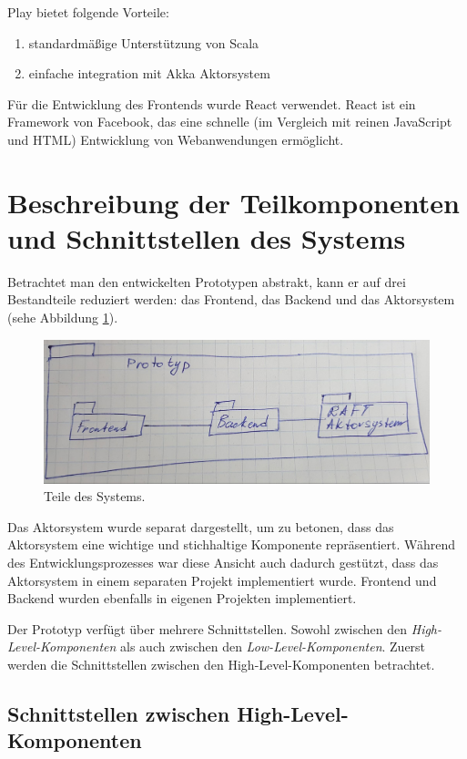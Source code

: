 Play bietet folgende Vorteile:

\begin{enumerate}
	\item standardmäßige Unterstützung von Scala
	
	\item einfache integration mit Akka Aktorsystem
\end{enumerate}

Für die Entwicklung des Frontends wurde React verwendet. React ist ein Framework von Facebook, das eine schnelle (im Vergleich mit reinen JavaScript und HTML) Entwicklung von Webanwendungen ermöglicht.

\section{Beschreibung der Teilkomponenten und Schnittstellen des Systems}

Betrachtet man den entwickelten Prototypen abstrakt, kann er auf drei Bestandteile reduziert werden: das Frontend, das Backend und das Aktorsystem (sehe Abbildung \ref{fig:system}).

\begin{figure}
	\centering
	\includegraphics[width=0.7\linewidth]{images/7_system}
	\caption{Teile des Systems.}
	\label{fig:system}
\end{figure}

Das Aktorsystem wurde separat dargestellt, um zu betonen, dass das Aktorsystem eine wichtige und stichhaltige Komponente repräsentiert. Während des Entwicklungsprozesses war diese Ansicht auch dadurch gestützt, dass das Aktorsystem in einem separaten Projekt implementiert wurde. Frontend und Backend wurden ebenfalls in eigenen Projekten implementiert.

Der Prototyp verfügt über mehrere Schnittstellen. Sowohl zwischen den \textit{High-Level-Komponenten} als auch zwischen den \textit{Low-Level-Komponenten}. Zuerst werden die Schnittstellen zwischen den High-Level-Komponenten betrachtet.

\subsection{Schnittstellen zwischen High-Level-Komponenten}

